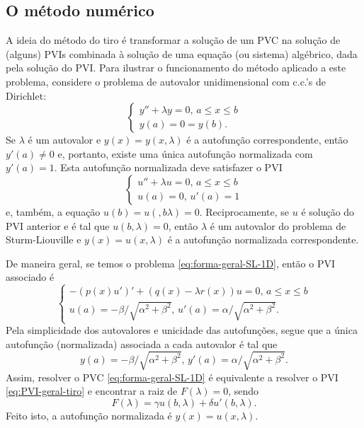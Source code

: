 \documentclass[twocolumn,showpacs,%
  nofootinbib,aps,superscriptaddress,%
  eqsecnum,prd,notitlepage,showkeys,10pt]{revtex4-1}
\renewcommand{\leq}{\leqslant}
\begin{document}
\subsection{O método numérico}
%
A ideia do método do tiro é transformar a solução de um PVC na solução
de (alguns) PVIs combinada à solução de uma equação (ou sistema) algébrico,
dada pela solução do PVI.
Para ilustrar o funcionamento do método aplicado a este problema, considere
o problema de autovalor unidimensional com c.c.'s de Dirichlet:
%
\[
    \left\{
    \begin{array}{l}
        y'' + \lambda y = 0, \, a \leq x \leq b \\
        y(a) = 0 = y(b).
    \end{array}
    \right.
\]
%
Se $\lambda$ é um autovalor e $y(x) = y(x,\lambda)$ é a autofunção correspondente,
então $y'(a) \neq 0$ e, portanto, existe uma única autofunção normalizada com $y'(a) = 1$.
Esta autofunção normalizada deve satisfazer o PVI
%
\[
    \left\{
    \begin{array}{l}
        u'' + \lambda u = 0, \, a \leq x \leq b \\
        u(a) = 0, \, u'(a) = 1
    \end{array}
    \right.
\]
%
e, também, a equação $u(b) = u(,b\lambda) = 0$. Reciprocamente, se $u$ é solução
do PVI anterior e é tal que $u(b,\lambda) = 0$, então $\lambda$ é um autovalor
do problema de Sturm-Liouville e $y(x) = u(x,\lambda)$ é a autofunção normalizada correspondente.

De maneira geral, se temos o problema \eqref{eq:forma-geral-SL-1D}, então o PVI associado é
%
\begin{equation}
\label{eq:PVI-geral-tiro}
    \left\{
        \begin{array}{l}
            -(p(x)u')' + (q(x) - \lambda r(x))u = 0, \, a \leq x \leq b \\
            u(a) = -\beta/\sqrt{\alpha^2 + \beta^2}, \,
            u'(a) = \alpha/\sqrt{\alpha^2 + \beta^2}.
        \end{array}
    \right.
\end{equation}
%
Pela simplicidade dos autovalores e unicidade das autofunções,
segue que a única autofunção (normalizada) associada a cada autovalor é tal que
%
\[
    y(a) = -\beta/\sqrt{\alpha^2 + \beta^2}, \,
    y'(a) = \alpha/\sqrt{\alpha^2 + \beta^2}.
\]
%
Assim, resolver o  PVC \eqref{eq:forma-geral-SL-1D} é equivalente a resolver o PVI \eqref{eq:PVI-geral-tiro}
e encontrar a raiz de $F(\lambda) = 0$, sendo
%
\begin{equation}
\label{eq:eq-algebrica-tiro}
    F(\lambda) = \gamma u(b, \lambda) + \delta u'(b, \lambda).
\end{equation}
%
Feito isto, a autofunção normalizada é $y(x) = u(x,\lambda)$.
\end{document}

